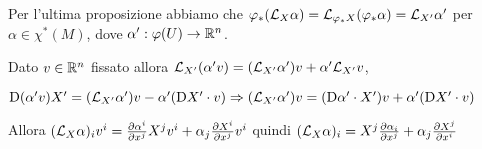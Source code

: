 Per l'ultima proposizione abbiamo che $\varphi_*(\mathcal L_X\alpha) = \mathcal L_{\varphi_*X}(\varphi_*\alpha) = \mathcal L_{X'}\alpha'$ per $\alpha\in\chi^*(M)$, dove $\alpha' : \varphi(U)\to\mathbb R^n$.

Dato $v\in\mathbb R^n$ fissato allora $\mathcal L_{X'}(\alpha'v) = (\mathcal L_{X'}\alpha')v + \alpha'\mathcal L_{X'}v$,

$\mathrm D (\alpha'v)X' = (\mathcal L_{X'} \alpha') v - \alpha'(\mathrm D X' \cdot v) \Rightarrow (\mathcal L_{X'}\alpha') v = (\mathrm D \alpha' \cdot X') v + \alpha' (\mathrm D X' \cdot v)$ 

Allora $(\mathcal L_X\alpha)_iv^i = \frac{\partial \alpha^i}{\partial x^j}X^jv^i + \alpha_j\frac{\partial X^i}{\partial x^j}v^i$
quindi $(\mathcal L_X\alpha)_i = X^j\frac{\partial \alpha_i}{\partial x^j} + \alpha_j\frac{\partial X^j}{\partial x^i}$



































































